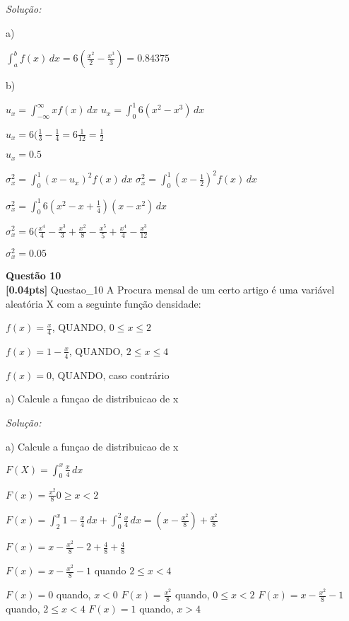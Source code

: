 \documentclass{article}
\newenvironment{problem}[2][Questão]
    { \begin{mdframed}[backgroundcolor=gray!20] \textbf{#1 #2} \\}
    {  \end{mdframed}}
\newenvironment{solution}
    {\textit{Solução:}}
    {}
\begin{document}
\begin{solution}

a) 

$\int_{a}^{b} f(x) \, dx = 6 (\frac{x^{2}}{2} -\frac{x^{3}}{3}) = 0.84375$

b) 

$u_{x} = \int_{-\infty}^{\infty} xf(x) \,dx$
$u_{x} = \int_{0}^{1} 6(x^{2} - x^{3}) \,dx$

$u_{x} = 6(\frac{1}{3} - \frac{1}{4} = 6 \frac{1}{12} = \frac{1}{2}$

$u_{x} = 0.5$

$\sigma_{x}^{2} = \int_{0}^{1} (x-u_{x})^{2} f(x) \, dx$
$\sigma_{x}^{2} = \int_{0}^{1} (x-\frac{1}{2})^{2} f(x) \, dx$

$\sigma_{x}^{2} = \int_{0}^{1} 6 (x^{2} - x + \frac{1}{4}) (x-x^{2}) \, dx$

$\sigma_{x}^{2} = 6 (\frac{x^{4}}{4}-\frac{x^{3}}{3}+\frac{x^{2}}{8}-\frac{x^{5}}{5}+\frac{x^{4}}{4}-\frac{x^{3}}{12}$

$\sigma_{x}^{2} = 0.05$

\end{solution}

\begin{problem}{10}
\textbf{[0.04pts]} Questao\_10 A  Procura  mensal  de  um  certo  artigo  é  uma  variável  aleatória  X  com  a  seguinte 
função densidade:

$f(x) = \frac{x}{4}$, QUANDO, $0 \leq x \leq 2$

$f(x) = 1-\frac{x}{4}$, QUANDO, $2 \leq x \leq 4$

$f(x) = 0$, QUANDO, caso contrário

a) Calcule a funçao de distribuicao de x



\end{problem}

\begin{solution}

a) Calcule a funçao de distribuicao de x

$F(X) = \int_{0}^{x} \frac{x}{4} \, dx$

$F(x) = \frac{x^{2}}{8} 0 \geq x < 2$

$F(x) = \int_{2}^{x} 1-\frac{x}{4} \, dx + \int_{0}^{2} \frac{x}{4} \, dx = (x - \frac{x^{2}}{8}) + \frac{x^{2}}{8}$

$F(x) = x - \frac{x^{2}}{8}-2+\frac{4}{8}+\frac{4}{8}$

$F(x) = x - \frac{x^{2}}{8}-1$ quando $2 \leq x < 4$

$F(x) = 0$                   quando, $x <0 $
$F(x) = \frac{x^{2}}{8}$     quando, $0 \leq x <2 $
$F(x) = x-\frac{x^{2}}{8}-1$ quando, $2 \leq x <4 $
$F(x) = 1$                   quando, $x >4 $

\end{solution}
\end{document}
